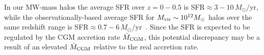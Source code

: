 \documentclass[fleqn,usenatbib]{mnras}
\newcommand{\Mdot}{\dot{M}}
\begin{document}






In our MW-mass halos the average SFR over $z=0-0.5$ is SFR$\approx 3-10\,M_\odot/$yr, while the observationally-based average SFR for $M_{\rm vir} \sim 10^{12} M_\odot$ halos over the same redshift range is SFR$\approx 0.7-6\,M_\odot/$yr~\citep{Behroozi2013}.
Since the SFR is expected to be regulated by the CGM accretion rate $\Mdot_{\rm CGM}$, this potential discrepancy may be a result of an elevated  $\Mdot_{\rm CGM}$ relative to the real accretion rate.
\end{document}
